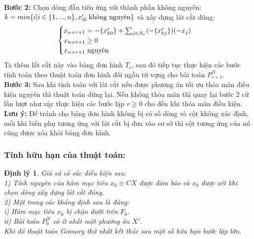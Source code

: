\documentclass[12pt,a4paper]{report}
\newtheorem{dl}{Định lý}
\begin{document}
\textbf{Bước 2:}
Chọn dòng đầu tiên ứng với thành phần không nguyên:\\
$k=min\{i|i\in \{1,...,n\},x_{i0}^r \hspace{0.1cm}\text{không nguyên}\}$ và xây dựng lát cắt đúng:\\
$$   \begin{cases}\label{latcat}
    x_{n+r+1}= -\{x_{k0}^r\} + \sum_{j\in N_r}(-\{x_{kj}^r\} )(-x_j)\\
    x_{n+r+1} \ge 0\\
    x_{n+r+1} \hspace{0.1cm} \text{nguyên}
\end{cases}$$
Ta thêm lắt cắt này vào bảng đơn hình $T_r$, sau đó tiếp tục thực hiện các bước tính toán theo thuật toán đơn hình đối ngẫu từ vựng cho bài toán $P^N_{r+1}$.\\

\textbf{Bước 3:}
Sau khi tính toán với lát cắt nếu được phương án tối ưu thỏa mãn điều kiện nguyên thì thuật toán dừng lại. Nếu không thỏa mãn thì quay lại bước 2 cứ lần lượt như vậy thực hiện các bước lặp $r \ge 0$ cho đến khi thỏa mãn điều kiện.\\

\textbf{Lưu ý:}
Để tránh cho bảng đơn hình không bị có số dòng và cột không xác định, mỗi khi biến phụ tương ứng với lát cắt bị đưa vào cơ sở thì cột tương ứng của nó cũng được xóa khỏi bảng đơn hình.
\subsubsection{Tính hữu hạn của thuật toán:}
\begin{dl}
Giả sử có các điều kiện sau:\\
1) Tính nguyên của hàm mục tiêu $x_0\equiv CX$ được đảm bảo và $x_0$ được xét khi chọn dòng xây dựng lát cắt đúng.\\
2) Một trong các khẳng định sau là đúng:\\
i) Hàm mục tiêu $x_0$ bị chặn dưới trên $F_0$.\\ 
ii) Bài toán $P^N_0$ có ít nhất một phương án $X'$.\\
 Khi đó thuật toán Gomory thứ nhất kết thúc sau một số hữu hạn bước lặp lớn.
 \end{dl}
 
\end{document}
